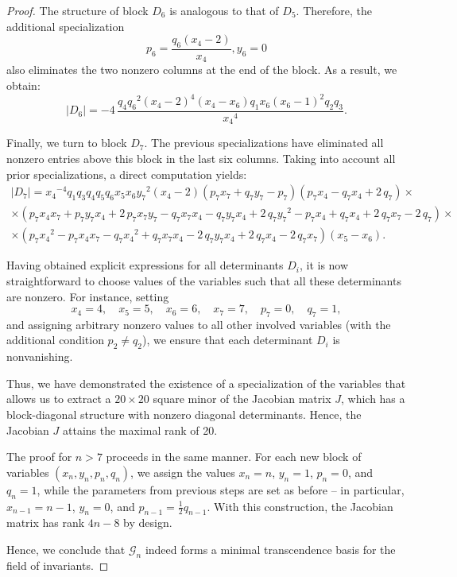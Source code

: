 \documentclass[12pt,reqno]{amsart}
\begin{document}
\begin{proof}
The structure of block \(D_6\) is analogous to that of \(D_5\). Therefore, the additional specialization
$$
p_{{6}}={\frac {q_{{6}} \left( x_{{4}}-2 \right) }{x_{{4}}}},y_{{6}}=0 
$$
also eliminates the two nonzero columns at the end of the block. As a result, we obtain:
$$
|D_6|=-4\,{\frac {q_{{4}}{q_{{6}}}^{2} \left( x_{{4}}-2 \right) ^{4} \left( 
x_{{4}}-x_{{6}} \right) q_{{1}}x_{{6}} \left( x_{{6}}-1 \right) ^{2}q_
{{2}}q_{{3}}}{{x_{{4}}}^{4}}}.
$$

Finally, we turn to block \(D_7\). The previous specializations have eliminated all nonzero entries above this block in the last six columns. Taking into account all prior specializations, a direct computation yields:
\begin{gather*}
|D_7|={{x_{
{4}}}^{-4}} q_{{1}}q_{{3}}q_{{4}}q_{{5}}q_{{6}}x_{{5}}x_{{6}}{y_{{7}}}^{2}
 \left( x_{{4}}-2 \right)  \left( p_{{7}}x_{{7}}+q_{{7}}y_{{7}}-p_{{7}
} \right)  \left( p_{{7}}x_{{4}}-q_{{7}}x_{{4}}+2\,q_{{7}} \right) \times \\ \times 
 \left( p_{{7}}x_{{4}}x_{{7}}+p_{{7}}y_{{7}}x_{{4}}+2\,p_{{7}}x_{{7}}y
_{{7}}-q_{{7}}x_{{7}}x_{{4}}-q_{{7}}y_{{7}}x_{{4}}+2\,q_{{7}}{y_{{7}}}
^{2}-p_{{7}}x_{{4}}+q_{{7}}x_{{4}}+2\,q_{{7}}x_{{7}}-2\,q_{{7}}
 \right) \times \\ \times \left( p_{{7}}{x_{{4}}}^{2}-p_{{7}}x_{{4}}x_{{7}}-q_{{7}}{x_
{{4}}}^{2}+q_{{7}}x_{{7}}x_{{4}}-2\,q_{{7}}y_{{7}}x_{{4}}+2\,q_{{7}}x_
{{4}}-2\,q_{{7}}x_{{7}} \right)  \left( x_{{5}}-x_{{6}} \right). 
\end{gather*} 


Having obtained explicit expressions for all determinants \(D_i\), it is now straightforward to choose values of the variables such that all these determinants are nonzero. For instance, setting
\[
x_4 = 4,\quad x_5 = 5,\quad x_6 = 6,\quad x_7 = 7,\quad p_7 = 0,\quad q_7 = 1,
\]
and assigning arbitrary nonzero values to all other involved variables (with the additional condition \(p_2 \neq q_2\)), we ensure that each determinant \(D_i\) is nonvanishing.

Thus, we have demonstrated the existence of a specialization of the variables that allows us to extract a \(20 \times 20\) square minor of the Jacobian matrix \(J\), which has a block-diagonal structure with nonzero diagonal determinants. Hence, the Jacobian \(J\) attains the maximal rank of 20.

The proof for \(n > 7\) proceeds in the same manner. For each new block of variables \((x_n, y_n, p_n, q_n)\), we assign the values \(x_n = n\), \(y_n = 1\), \(p_n = 0\), and \(q_n = 1\), while the parameters from previous steps are set as before -- in particular, \(x_{n-1} = n-1\), \(y_n = 0\), and \(p_{n-1} = \frac{1}{2} q_{n-1}\). With this construction, the Jacobian matrix has rank \(4n - 8\) by design.

Hence, we conclude that \(\mathcal{G}_n\) indeed forms a minimal transcendence basis for the field of invariants.
\end{proof}
\end{document}
